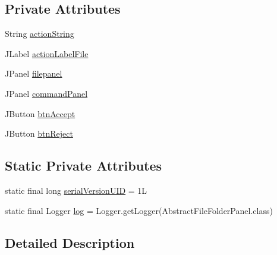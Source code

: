 \subsection*{Private Attributes}
\begin{DoxyCompactItemize}
\item 
String \hyperlink{classcom_1_1poly_1_1nlp_1_1filekommander_1_1views_1_1panels_1_1_abstract_file_folder_panel_a4aa17cf3129edfcd0246d4486f646987}{action\-String}
\item 
J\-Label \hyperlink{classcom_1_1poly_1_1nlp_1_1filekommander_1_1views_1_1panels_1_1_abstract_file_folder_panel_a0edf5a396a146d218c4c1924636715d8}{action\-Label\-File}
\item 
J\-Panel \hyperlink{classcom_1_1poly_1_1nlp_1_1filekommander_1_1views_1_1panels_1_1_abstract_file_folder_panel_abd069d68f414efb9497427f7df50e7f5}{filepanel}
\item 
J\-Panel \hyperlink{classcom_1_1poly_1_1nlp_1_1filekommander_1_1views_1_1panels_1_1_abstract_file_folder_panel_a38866bb93300c6f6ce1597367f37510d}{command\-Panel}
\item 
J\-Button \hyperlink{classcom_1_1poly_1_1nlp_1_1filekommander_1_1views_1_1panels_1_1_abstract_file_folder_panel_a723f421b878bd4d7207a614376b03315}{btn\-Accept}
\item 
J\-Button \hyperlink{classcom_1_1poly_1_1nlp_1_1filekommander_1_1views_1_1panels_1_1_abstract_file_folder_panel_a3ae502ea80c38e1160cf63f3944638b2}{btn\-Reject}
\end{DoxyCompactItemize}
\subsection*{Static Private Attributes}
\begin{DoxyCompactItemize}
\item 
static final long \hyperlink{classcom_1_1poly_1_1nlp_1_1filekommander_1_1views_1_1panels_1_1_abstract_file_folder_panel_ae889f90306f23cb850c4f6279309bb46}{serial\-Version\-U\-I\-D} = 1\-L
\item 
static final Logger \hyperlink{classcom_1_1poly_1_1nlp_1_1filekommander_1_1views_1_1panels_1_1_abstract_file_folder_panel_ac381bcdeb4de3de4b96846422b4db0c4}{log} = Logger.\-get\-Logger(Abstract\-File\-Folder\-Panel.\-class)
\end{DoxyCompactItemize}


\subsection{Detailed Description}


